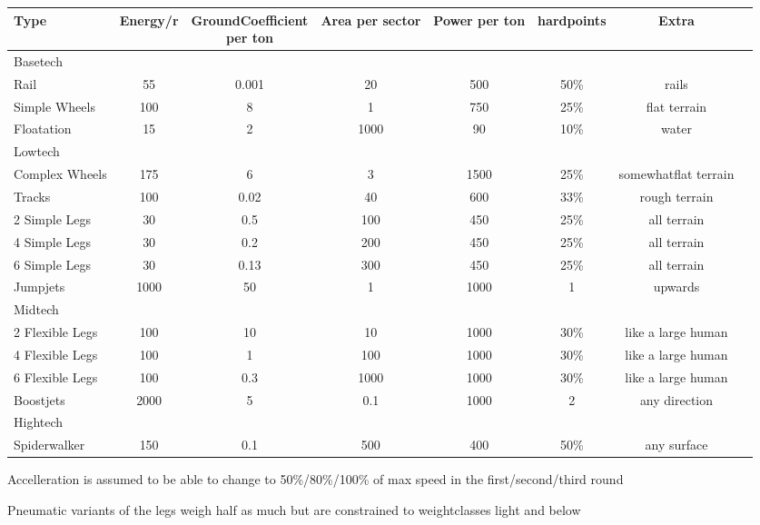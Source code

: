 \begin{tabular}{l|ccccccl}
    Type    & Energy/r & \makecell[l]{GroundCoefficient\\ per ton} & Area per sector & Power per ton & hardpoints &Extra\\
    \hline Basetech\\
    Rail                 & 55 & 0.001 & 20 & 500 & 50\% & rails \\
    Simple Wheels        & 100 & 8 & 1 & 750 & 25\% & flat terrain \\
    Floatation           & 15 & 2 & 1000 & 90 & 10\% & water\\
    \hline Lowtech\\
    Complex Wheels       & 175 & 6 & 3 & 1500 & 25\% &  somewhatflat terrain \\
    Tracks               & 100 & 0.02 & 40 & 600 & 33\% & rough terrain\\
    2 Simple Legs        & 30 & 0.5 & 100 & 450 & 25\% & all terrain\\
    4 Simple Legs        & 30 & 0.2 & 200 & 450 & 25\% & all terrain\\
    6 Simple Legs        & 30 & 0.13 & 300 & 450 & 25\% & all terrain\\
    Jumpjets             & 1000 & 50 & 1 & 1000 & 1 & upwards\\
    \hline Midtech\\
    2 Flexible Legs      & 100 & 10 & 10 & 1000 & 30\% &  like a large human\\
    4 Flexible Legs      & 100 & 1 & 100 & 1000 & 30\% &  like a large human\\
    6 Flexible Legs      & 100 & 0.3 & 1000 & 1000 & 30\% &  like a large human\\
    Boostjets            & 2000 & 5 & 0.1 & 1000 & 2 &  any direction\\
    \hline Hightech\\
    Spiderwalker         & 150 & 0.1 & 500 & 400 & 50\% & any surface
\end{tabular}

Accelleration is assumed to be able to change to 50\%/80\%/100\% of max speed  in the first/second/third round\par
Pneumatic variants of the legs weigh half as much but are constrained to weightclasses light and below\par

